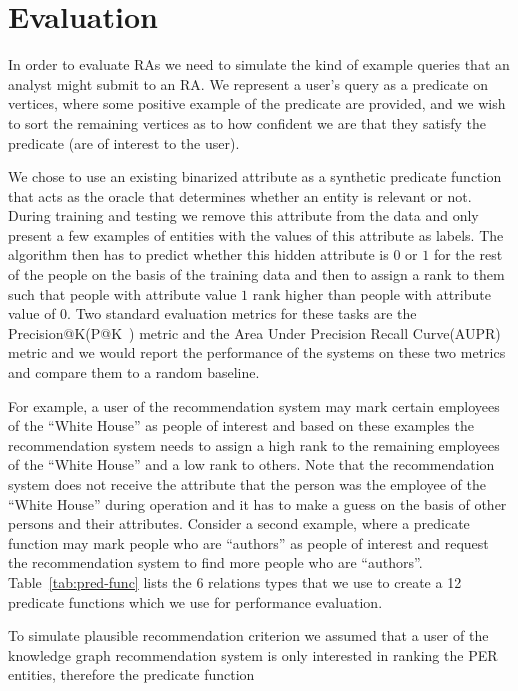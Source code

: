 \documentclass[paper=a4,fontsize=11pt]{scrartcl}
\makeatletter
\newcommand{\Tabref}[1]{Table~\ref{#1}}
\numberwithin{equation}{section}    %
\numberwithin{figure}{section}      %
\numberwithin{table}{section}       %
\newcommand{\PK}{P@K\ }
\makeatother
\begin{document}
\section{Evaluation}
\label{sec:evaluation}
In order to evaluate RAs we need to simulate the kind of example queries
that an analyst might submit to an RA. We represent a user's query as a
predicate on vertices, where some positive example of the predicate are
provided, and we wish to sort the remaining vertices as to how confident we are
that they satisfy the predicate (are of interest to the user).

We chose to use an existing binarized attribute as a synthetic predicate function that
acts as the oracle that determines whether an entity is relevant or not.
During training and testing we remove this attribute from the data and
only present a few examples of entities with the values of this attribute as labels.
The algorithm then has to predict whether this hidden attribute is $0$ or $1$ for the
rest of the people on the basis of the training data and then to assign a rank to them
such that people with attribute value $1$ rank higher than people with attribute value of $0$.
Two standard evaluation metrics for these tasks are the {Precision@K}(\PK) metric and the
{Area Under Precision Recall Curve}(AUPR) metric and we would report the performance of the systems
on these two metrics and compare them to a random baseline.
\begin{example}\label{ex:eval}
    For example, a user of the recommendation system may mark certain employees of the
  ``White House'' as people of interest and based on these examples the recommendation
  system needs to assign a high rank to the remaining employees of the ``White House'' and
  a low rank to others. Note that the recommendation system does not receive the
  attribute that the person was the employee of the ``White House'' during operation
  and it has to make a guess on the basis of other persons and their attributes.
  Consider a second example, where a predicate function may mark people who are
  ``authors'' as people of interest and request the recommendation system to find more
  people who are ``authors''. \Tabref{tab:pred-func} lists the 6 relations types that we
  use to create a 12 predicate functions which we use for performance evaluation.
\end{example}
To simulate plausible recommendation criterion we assumed that
a user of the knowledge graph recommendation system is only
interested in ranking the \textsc{PER} entities, therefore the predicate function
\end{document}

